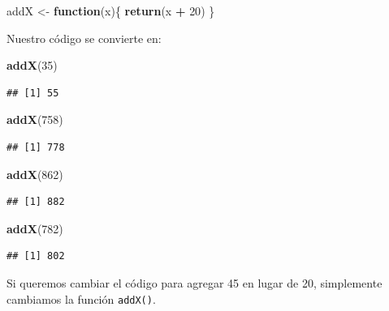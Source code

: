 \documentclass[
]{book}
\newenvironment{Shaded}{\begin{snugshade}}{\end{snugshade}}
\newcommand{\ControlFlowTok}[1]{\textcolor[rgb]{0.13,0.29,0.53}{\textbf{#1}}}
\newcommand{\DecValTok}[1]{\textcolor[rgb]{0.00,0.00,0.81}{#1}}
\newcommand{\KeywordTok}[1]{\textcolor[rgb]{0.13,0.29,0.53}{\textbf{#1}}}
\newcommand{\NormalTok}[1]{#1}
\newcommand{\OperatorTok}[1]{\textcolor[rgb]{0.81,0.36,0.00}{\textbf{#1}}}
\newcommand{\StringTok}[1]{\textcolor[rgb]{0.31,0.60,0.02}{#1}}
\begin{document}
\begin{Shaded}
\begin{Highlighting}[]
\NormalTok{addX <-}\StringTok{ }\ControlFlowTok{function}\NormalTok{(x)\{}
  \KeywordTok{return}\NormalTok{(x }\OperatorTok{+}\StringTok{ }\DecValTok{20}\NormalTok{)}
\NormalTok{\}}
\end{Highlighting}
\end{Shaded}

Nuestro código se convierte en:

\begin{Shaded}
\begin{Highlighting}[]
\KeywordTok{addX}\NormalTok{(}\DecValTok{35}\NormalTok{)}
\end{Highlighting}
\end{Shaded}

\begin{verbatim}
## [1] 55
\end{verbatim}

\begin{Shaded}
\begin{Highlighting}[]
\KeywordTok{addX}\NormalTok{(}\DecValTok{758}\NormalTok{)}
\end{Highlighting}
\end{Shaded}

\begin{verbatim}
## [1] 778
\end{verbatim}

\begin{Shaded}
\begin{Highlighting}[]
\KeywordTok{addX}\NormalTok{(}\DecValTok{862}\NormalTok{)}
\end{Highlighting}
\end{Shaded}

\begin{verbatim}
## [1] 882
\end{verbatim}

\begin{Shaded}
\begin{Highlighting}[]
\KeywordTok{addX}\NormalTok{(}\DecValTok{782}\NormalTok{)}
\end{Highlighting}
\end{Shaded}

\begin{verbatim}
## [1] 802
\end{verbatim}

Si queremos cambiar el código para agregar 45 en lugar de 20, simplemente cambiamos la función \texttt{addX()}.
\end{document}
